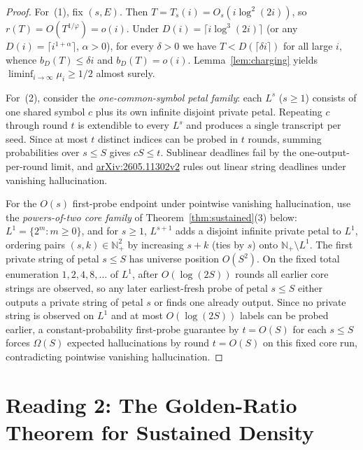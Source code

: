 \documentclass[11pt]{article}
\theoremstyle{plain}
\theoremstyle{definition}
\theoremstyle{remark}
\begin{document}
\begin{proof}
For~(1), fix $(s, E)$. Then $T = T_s(i) = O_s(i \log^2(2i))$, so $r(T) = O(T^{1/\varphi}) = o(i)$.
Under $D(i) = \lceil i \log^3(2i) \rceil$ (or any $D(i) = \lceil i^{1+\alpha} \rceil$, $\alpha > 0$), for every $\delta > 0$ we have $T < D(\lceil \delta i \rceil)$ for all large $i$, whence $b_D(T) \le \delta i$ and $b_D(T) = o(i)$.
Lemma~\ref{lem:charging} yields $\liminf_{i \to \infty} \mu_i \ge 1/2$ almost surely.

For~(2), consider the \emph{one-common-symbol petal family}: each $L^s$ ($s \ge 1$) consists of one shared symbol $c$ plus its own infinite disjoint private petal.
Repeating $c$ through round $t$ is extendible to every $L^s$ and produces a single transcript per seed.
Since at most $t$ distinct indices can be probed in $t$ rounds, summing probabilities over $s \le S$ gives $cS \le t$.
Sublinear deadlines fail by the one-output-per-round limit, and \href{https://arxiv.org/abs/2605.11302}{arXiv:2605.11302v2} rules out linear string deadlines under vanishing hallucination.

For the $O(s)$ first-probe endpoint under pointwise vanishing hallucination, use the \emph{powers-of-two core family} of Theorem~\ref{thm:sustained}(3) below: $L^1 = \{2^m : m \ge 0\}$, and for $s \ge 1$, $L^{s+1}$ adds a disjoint infinite private petal to $L^1$, ordering pairs $(s, k) \in \mathbb{N}_+^2$ by increasing $s + k$ (ties by $s$) onto $\mathbb{N}_+ \setminus L^1$.
The first private string of petal $s \le S$ has universe position $O(S^2)$.
On the fixed total enumeration $1, 2, 4, 8, \dots$ of $L^1$, after $O(\log(2S))$ rounds all earlier core strings are observed, so any later earliest-fresh probe of petal $s \le S$ either outputs a private string of petal $s$ or finds one already output.
Since no private string is observed on $L^1$ and at most $O(\log(2S))$ labels can be probed earlier, a constant-probability first-probe guarantee by $t = O(S)$ for each $s \le S$ forces $\Omega(S)$ expected hallucinations by round $t = O(S)$ on this fixed core run, contradicting pointwise vanishing hallucination.
\end{proof}

\section{Reading 2: The Golden-Ratio Theorem for Sustained Density}
\end{document}
